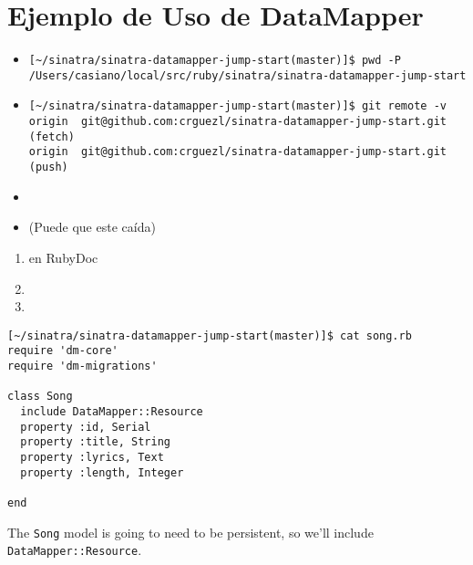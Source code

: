 \section{Ejemplo de Uso de DataMapper}
\label{section:ejemplodedatamapper}

\begin{itemize}
\item
\begin{verbatim}
[~/sinatra/sinatra-datamapper-jump-start(master)]$ pwd -P
/Users/casiano/local/src/ruby/sinatra/sinatra-datamapper-jump-start
\end{verbatim}
\item
\begin{verbatim}
[~/sinatra/sinatra-datamapper-jump-start(master)]$ git remote -v
origin  git@github.com:crguezl/sinatra-datamapper-jump-start.git (fetch)
origin  git@github.com:crguezl/sinatra-datamapper-jump-start.git (push)
\end{verbatim}
\item 
{}
\item
{}
(Puede que este caída)
\end{itemize}

\begin{enumerate}
\item 
{}
en RubyDoc
\item 
{}
\item 
{}

\end{enumerate}

\begin{verbatim}
[~/sinatra/sinatra-datamapper-jump-start(master)]$ cat song.rb 
require 'dm-core'
require 'dm-migrations'

class Song
  include DataMapper::Resource
  property :id, Serial
  property :title, String
  property :lyrics, Text
  property :length, Integer
  
end
\end{verbatim}
The \verb|Song| model is going to need to be persistent, 
so we'll include \verb|DataMapper::Resource|. 


